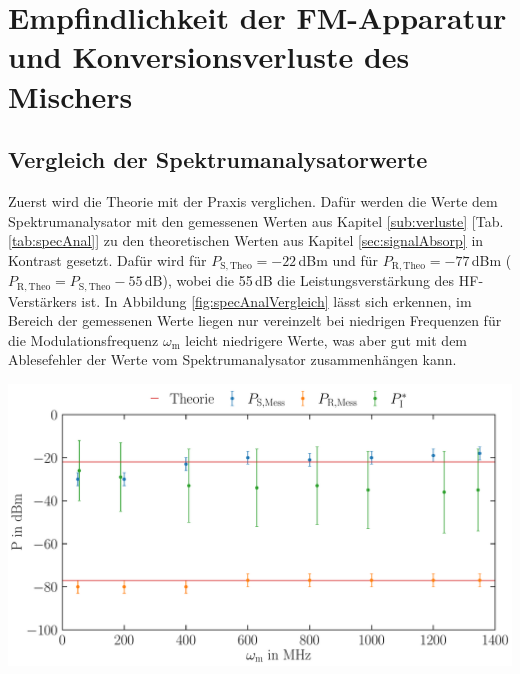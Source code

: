 
\section{Empfindlichkeit der FM-Apparatur und Konversionsverluste des Mischers}
\label{sec:verlusteAuswertung}

\subsection{Vergleich der Spektrumanalysatorwerte}
\label{sub:specAnalVergleich}

Zuerst wird die Theorie mit der Praxis verglichen. Dafür werden die Werte dem Spektrumanalysator mit den gemessenen Werten aus Kapitel \ref{sub:verluste} [Tab. \ref{tab:specAnal}] zu den theoretischen Werten aus Kapitel \ref{sec:signalAbsorp} in Kontrast gesetzt. Dafür wird für $P_\mathrm{S,Theo} = -22$\,dBm und für $P_\mathrm{R,Theo}= -77$\,dBm ($P_\mathrm{R,Theo} = P_\mathrm{S,Theo} - 55\,\mathrm{dB}$), wobei die 55\,dB die Leistungsverstärkung des HF-Verstärkers ist. In Abbildung \ref{fig:specAnalVergleich} lässt sich erkennen, im Bereich der gemessenen Werte liegen nur vereinzelt bei niedrigen Frequenzen für die Modulationsfrequenz $\omega_\mathrm{m}$ leicht niedrigere Werte, was aber gut mit dem Ablesefehler der Werte vom Spektrumanalysator zusammenhängen kann.
\begin{center}
    \captionsetup{type=figure}
    \includegraphics[scale=0.35]{Bilder/Auswertung/62/Signal-Rausch.pdf}
    \label{fig:specAnalVergleich}
\end{center}

